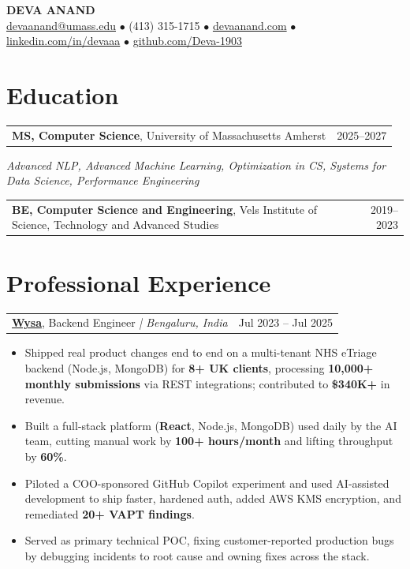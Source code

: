 \documentclass[letterpaper,11pt]{article}
\makeatletter
\newcommand{\eduItem}[3]{%
  \begin{tabular*}{\textwidth}{@{}l@{\extracolsep{\fill}}r@{}}
    \textbf{#1}, #2 & #3 \\
  \end{tabular*}\par
}
\newcommand{\expItem}[4]{%
  \vspace{3pt}
  \begin{tabular*}{\textwidth}{@{}l@{\extracolsep{\fill}}r@{}}
    \textbf{#1}, #2 \textit{| #3} & #4 \\
  \end{tabular*}\par\vspace{-2pt}
}
\makeatother
\begin{document}
\begin{center}
    {\fontsize{18}{20}\selectfont\bfseries DEVA ANAND}\\ \vspace{3pt}
    {\small
    \href{mailto:devaanand@umass.edu}{devaanand@umass.edu}
    \enspace$\bullet$\enspace
    (413) 315-1715
    \enspace$\bullet$\enspace
    \href{https://devaanand.com}{devaanand.com}
    \enspace$\bullet$\enspace
    \href{https://linkedin.com/in/devaaa/}{linkedin.com/in/devaaa}
    \enspace$\bullet$\enspace
    \href{https://github.com/Deva-1903}{github.com/Deva-1903}}
\end{center}
\vspace{-6pt}

\section{Education}
\eduItem{MS, Computer Science}{University of Massachusetts Amherst}{2025--2027}
{\small\textit{Advanced NLP, Advanced Machine Learning, Optimization in CS, Systems for Data Science, Performance Engineering}}\par
\vspace{3pt}
\eduItem{BE, Computer Science and Engineering}{Vels Institute of Science, Technology and Advanced Studies}{2019--2023}

\section{Professional Experience}

\expItem{\href{https://www.wysa.io}{Wysa}}{Backend Engineer}{Bengaluru, India}{Jul 2023 -- Jul 2025}
\begin{itemize}
  \item Shipped real product changes end to end on a multi-tenant NHS eTriage backend (Node.js, MongoDB) for \textbf{8+ UK clients}, processing \textbf{10{,}000+ monthly submissions} via REST integrations; contributed to \textbf{\$340K+} in revenue.
  \item Built a full-stack platform (\textbf{React}, Node.js, MongoDB) used daily by the AI team, cutting manual work by \textbf{100+ hours/month} and lifting throughput by \textbf{60\%}.
  \item Piloted a COO-sponsored GitHub Copilot experiment and used AI-assisted development to ship faster, hardened auth, added AWS KMS encryption, and remediated \textbf{20+ VAPT findings}.
  \item Served as primary technical POC, fixing customer-reported production bugs by debugging incidents to root cause and owning fixes across the stack.
\end{itemize}
\end{document}
